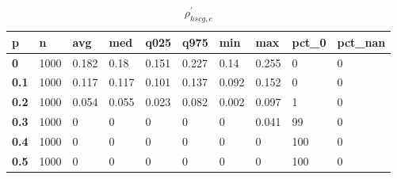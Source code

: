 \begin{table}[h]
 \centering 
\footnotesize
\caption{$\rho_{hscg,c}^\prime $}
\label{tab:alphahscgc}
\begin{tabular}[h]{|l|l|l|l|l|l|l|l|l|l|
    } \hline
\textbf{ p} & \textbf{ n} & \textbf{ avg} & \textbf{ med} & \textbf{ q025} & \textbf{ q975} & \textbf{ min} & \textbf{ max} & \textbf{ pct\_0} & \textbf{ pct\_nan}
    \\ \hline
  \textbf{  0} & 1000 & 0.182 &  0.18 & 0.151 & 0.227 &  0.14 & 0.255 &   0 & 0
    \\ \hline
  \textbf{0.1} & 1000 & 0.117 & 0.117 & 0.101 & 0.137 & 0.092 & 0.152 &   0 & 0
    \\ \hline
  \textbf{0.2} & 1000 & 0.054 & 0.055 & 0.023 & 0.082 & 0.002 & 0.097 &   1 & 0
    \\ \hline
  \textbf{0.3} & 1000 &     0 &     0 &     0 &     0 &     0 & 0.041 &  99 & 0
    \\ \hline
  \textbf{0.4} & 1000 &     0 &     0 &     0 &     0 &     0 &     0 & 100 & 0
    \\ \hline
  \textbf{0.5} & 1000 &     0 &     0 &     0 &     0 &     0 &     0 & 100 & 0
    \\ \hline
 \end{tabular}
 \end{table}
